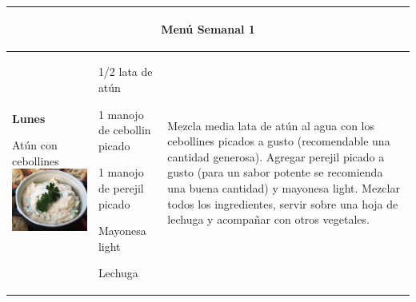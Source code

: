 \documentclass[menu.tex]{subfiles}
\begin{document}
    
    \begin{tabular} {p{3.5cm} p{4cm} p{9cm}}
        \multicolumn{3}{c}{\begin{LARGE}Menú Semanal 1\end{LARGE}}\\
        \hline
    
        \pbox{20cm}
        {
            \rule{0pt}{3ex}\begin{large}\textbf{Lunes}\end{large}\\ 
            \rule{0pt}{2ex}Atún con \\cebollines \\
            \includegraphics[scale=0.4]{atun-cebollines} 
        } & 
        \vspace{-2cm}
        \begin{compactitem} 
            \begin{footnotesize}
                \item 1/2 lata de atún
                \item 1 manojo de cebollin picado
                \item 1 manojo de perejil picado
                \item Mayonesa light
                \item Lechuga
            \end{footnotesize}
        \end{compactitem}&
        \vspace{-2cm}
        Mezcla media lata de atún al agua con los cebollines picados a gusto (recomendable una cantidad generosa). Agregar perejil picado a gusto (para un sabor potente se recomienda una buena cantidad) y mayonesa light. Mezclar todos los ingredientes, servir sobre una hoja de lechuga y acompañar con otros vegetales.\\
        \hline
        

\end{tabular}
\end{document}
